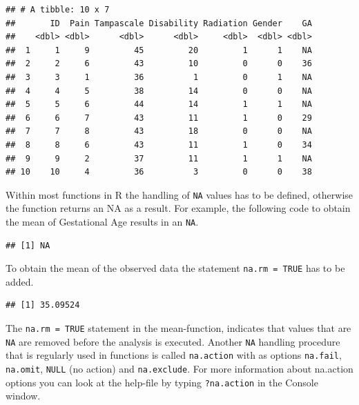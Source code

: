 \documentclass[
]{book}
\newenvironment{Shaded}{\begin{snugshade}}{\end{snugshade}}
\newcommand{\DataTypeTok}[1]{\textcolor[rgb]{0.13,0.29,0.53}{#1}}
\newcommand{\KeywordTok}[1]{\textcolor[rgb]{0.13,0.29,0.53}{\textbf{#1}}}
\newcommand{\NormalTok}[1]{#1}
\newcommand{\OperatorTok}[1]{\textcolor[rgb]{0.81,0.36,0.00}{\textbf{#1}}}
\newcommand{\OtherTok}[1]{\textcolor[rgb]{0.56,0.35,0.01}{#1}}
\begin{document}
\begin{verbatim}
## # A tibble: 10 x 7
##       ID  Pain Tampascale Disability Radiation Gender    GA
##    <dbl> <dbl>      <dbl>      <dbl>     <dbl>  <dbl> <dbl>
##  1     1     9         45         20         1      1    NA
##  2     2     6         43         10         0      0    36
##  3     3     1         36          1         0      1    NA
##  4     4     5         38         14         0      0    NA
##  5     5     6         44         14         1      1    NA
##  6     6     7         43         11         1      0    29
##  7     7     8         43         18         0      0    NA
##  8     8     6         43         11         1      0    34
##  9     9     2         37         11         1      1    NA
## 10    10     4         36          3         0      0    38
\end{verbatim}

Within most functions in R the handling of \texttt{NA} values has to be defined, otherwise the function returns an NA as a result. For example, the following code to obtain the mean of Gestational Age results in an \texttt{NA}.

\begin{Shaded}
\end{Shaded}

\begin{verbatim}
## [1] NA
\end{verbatim}

To obtain the mean of the observed data the statement \texttt{na.rm\ =\ TRUE} has to be added.

\begin{Shaded}
\end{Shaded}

\begin{verbatim}
## [1] 35.09524
\end{verbatim}

The \texttt{na.rm\ =\ TRUE} statement in the mean-function, indicates that values that are \texttt{NA} are removed before the analysis is executed. Another \texttt{NA} handling procedure that is regularly used in functions is called \texttt{na.action} with as options \texttt{na.fail}, \texttt{na.omit}, \texttt{NULL} (no action) and \texttt{na.exclude}. For more information about na.action options you can look at the help-file by typing \texttt{?na.action} in the Console window.
\end{document}
